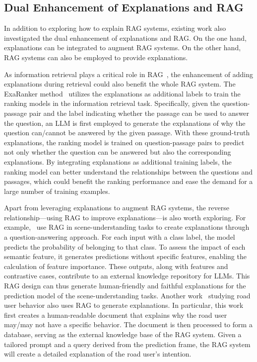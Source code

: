 \subsection{Dual Enhancement of Explanations and RAG}
In addition to exploring how to explain RAG systems, existing work also investigated the dual enhancement of explanations and RAG. On the one hand, explanations can be integrated to augment RAG systems. On the other hand, RAG systems can also be employed to provide explanations.

As information retrieval plays a critical role in RAG~\cite{cuconasu2024power}, the enhancement of adding explanations during retrieval could also benefit the whole RAG system. The ExaRanker method~\cite{ferraretto2023exaranker} utilizes the explanations as additional labels to train the ranking models in the information retrieval task. Specifically, given the question-passage pair and the label indicating whether the passage can be used to answer the question, an LLM is first employed to generate the explanations of why the question can/cannot be answered by the given passage. With these ground-truth explanations, the ranking model is trained on question-passage pairs to predict not only whether the question can be answered but also the corresponding explanations. By integrating explanations as additional training labels, the ranking model can better understand the relationships between the questions and passages, which could benefit the ranking performance and ease the demand for a large number of training examples. 

Apart from leveraging explanations to augment RAG systems, the reverse relationship—using RAG to improve explanations—is also worth exploring. For example,~\citet{tekkesinoglu2024feature} use RAG in scene-understanding tasks to create explanations through a question-answering approach. For each input with a class label, the model predicts the probability of belonging to that class. To assess the impact of each semantic feature, it generates predictions without specific features, enabling the calculation of feature importance. These outputs, along with features and contrastive cases, contribute to an external knowledge repository for LLMs. This RAG design can thus generate human-friendly and faithful explanations for the prediction model of the scene-understanding tasks. Another work~\cite{hussien2024rag} studying road user behavior also uses RAG to generate explanations. In particular, this work first creates a human-readable document that explains why the road user may/may not have a specific behavior. The document is then processed to form a database, serving as the external knowledge base of the RAG system. Given a tailored prompt and a query derived from the prediction frame, the RAG system will create a detailed explanation of the road user's intention.

